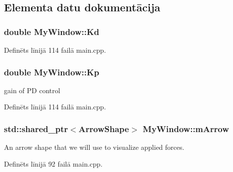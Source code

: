 \subsection{Elementa datu dokumentācija}
\subsubsection[{\texorpdfstring{Kd}{Kd}}]{\setlength{\rightskip}{0pt plus 5cm}double My\+Window\+::\+Kd\hspace{0.3cm}{\ttfamily [protected]}}\hypertarget{class_my_window_a2113bdacdbc4042ed43fafb852a720e4}{}\label{class_my_window_a2113bdacdbc4042ed43fafb852a720e4}


Definēts līnijā 114 failā main.\+cpp.

\subsubsection[{\texorpdfstring{Kp}{Kp}}]{\setlength{\rightskip}{0pt plus 5cm}double My\+Window\+::\+Kp\hspace{0.3cm}{\ttfamily [protected]}}\hypertarget{class_my_window_aaaf55ec8565cb69f691fdc7046cc2b7e}{}\label{class_my_window_aaaf55ec8565cb69f691fdc7046cc2b7e}


gain of PD control 



Definēts līnijā 114 failā main.\+cpp.

\subsubsection[{\texorpdfstring{m\+Arrow}{mArrow}}]{\setlength{\rightskip}{0pt plus 5cm}std\+::shared\+\_\+ptr$<$Arrow\+Shape$>$ My\+Window\+::m\+Arrow\hspace{0.3cm}{\ttfamily [protected]}}\hypertarget{class_my_window_a95e499f45c2bb2d92b8038300eaaa51d}{}\label{class_my_window_a95e499f45c2bb2d92b8038300eaaa51d}


An arrow shape that we will use to visualize applied forces. 



Definēts līnijā 92 failā main.\+cpp.

